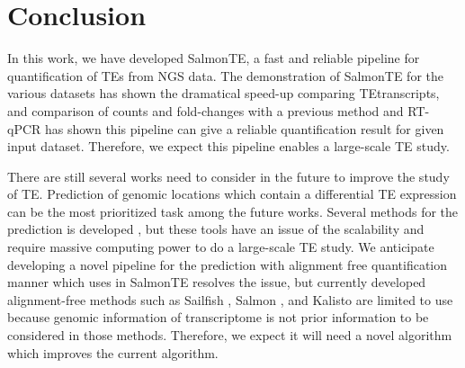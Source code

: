 \documentclass{ws-procs11x85}
\begin{document}
\section{Conclusion}


In this work, we have developed SalmonTE, a fast and reliable pipeline for quantification of TEs from 
NGS data.
The demonstration of SalmonTE for the various datasets has shown the dramatical speed-up comparing TEtranscripts, 
and comparison of counts and fold-changes with a previous method and RT-qPCR has shown this pipeline can give a reliable quantification result for given input dataset. Therefore, we expect this pipeline enables a large-scale TE study.

There are still several works need to consider in the future to improve the study of TE. Prediction of genomic locations which 
contain a differential TE expression can be the most prioritized task among the future works. Several methods for the prediction is
developed \cite{de2017identifying,criscione2014transcriptional}, but these tools have an issue of the scalability and require
massive computing power to do a large-scale TE study. We
anticipate developing a novel pipeline for the prediction with alignment free quantification manner which uses in SalmonTE
resolves the issue, but currently developed alignment-free methods such as Sailfish \cite{patro2014sailfish}, Salmon \cite{patro2017salmon}, 
and Kalisto \cite{bray2015near} are limited to use
because genomic information of transcriptome is not prior information to be considered in those methods.
Therefore, we expect it will need a novel algorithm which improves the current algorithm.



\end{document}
